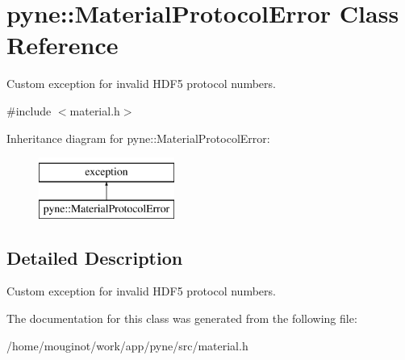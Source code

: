 \hypertarget{classpyne_1_1_material_protocol_error}{}\section{pyne\+:\+:Material\+Protocol\+Error Class Reference}
\label{classpyne_1_1_material_protocol_error}


Custom exception for invalid H\+D\+F5 protocol numbers.  




{\ttfamily \#include $<$material.\+h$>$}

Inheritance diagram for pyne\+:\+:Material\+Protocol\+Error\+:\begin{figure}[H]
\begin{center}
\leavevmode
\includegraphics[height=2.000000cm]{classpyne_1_1_material_protocol_error}
\end{center}
\end{figure}


\subsection{Detailed Description}
Custom exception for invalid H\+D\+F5 protocol numbers. 

The documentation for this class was generated from the following file\+:\begin{DoxyCompactItemize}
\item 
/home/mouginot/work/app/pyne/src/material.\+h\end{DoxyCompactItemize}
